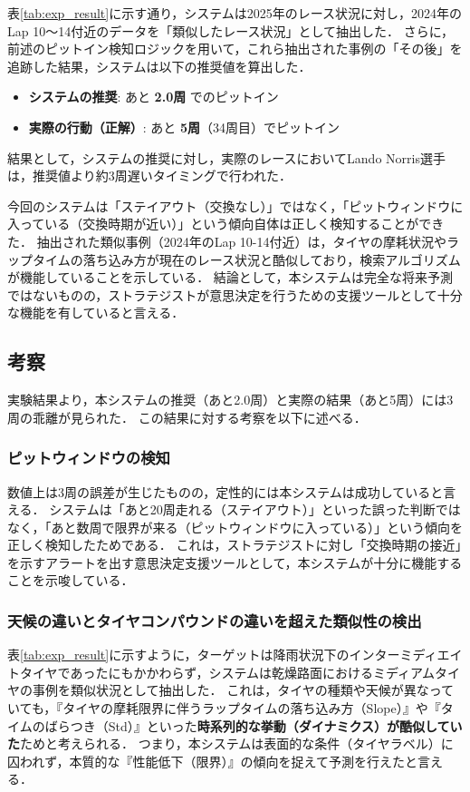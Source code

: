\documentclass{deimj}
\begin{document}
表\ref{tab:exp_result}に示す通り，システムは2025年のレース状況に対し，2024年のLap 10〜14付近のデータを「類似したレース状況」として抽出した．
さらに，前述のピットイン検知ロジックを用いて，これら抽出された事例の「その後」を追跡した結果，システムは以下の推奨値を算出した．

\begin{itemize}
  \item \textbf{システムの推奨}: あと \textbf{2.0周} でのピットイン
  \item \textbf{実際の行動（正解）}: あと \textbf{5周}（34周目）でピットイン
\end{itemize}

結果として，システムの推奨に対し，実際のレースにおいてLando Norris選手は，推奨値より約3周遅いタイミングで行われた．

今回のシステムは「ステイアウト（交換なし）」ではなく，「ピットウィンドウに入っている（交換時期が近い）」という傾向自体は正しく検知することができた．
抽出された類似事例（2024年のLap 10-14付近）は，タイヤの摩耗状況やラップタイムの落ち込み方が現在のレース状況と酷似しており，検索アルゴリズムが機能していることを示している．
結論として，本システムは完全な将来予測ではないものの，ストラテジストが意思決定を行うための支援ツールとして十分な機能を有していると言える．

\subsection{考察}

実験結果より，本システムの推奨（あと2.0周）と実際の結果（あと5周）には3周の乖離が見られた．
この結果に対する考察を以下に述べる．

\subsubsection{ピットウィンドウの検知}
数値上は3周の誤差が生じたものの，定性的には本システムは成功していると言える．
システムは「あと20周走れる（ステイアウト）」といった誤った判断ではなく，「あと数周で限界が来る（ピットウィンドウに入っている）」という傾向を正しく検知したためである．
これは，ストラテジストに対し「交換時期の接近」を示すアラートを出す意思決定支援ツールとして，本システムが十分に機能することを示唆している．

\subsubsection{天候の違いとタイヤコンパウンドの違いを超えた類似性の検出}
表\ref{tab:exp_result}に示すように，ターゲットは降雨状況下のインターミディエイトタイヤであったにもかかわらず，システムは乾燥路面におけるミディアムタイヤの事例を類似状況として抽出した． これは，タイヤの種類や天候が異なっていても，『タイヤの摩耗限界に伴うラップタイムの落ち込み方（Slope）』や『タイムのばらつき（Std）』といった\textbf{時系列的な挙動（ダイナミクス）が酷似していた}ためと考えられる． つまり，本システムは表面的な条件（タイヤラベル）に囚われず，本質的な『性能低下（限界）』の傾向を捉えて予測を行えたと言える．
\end{document}
